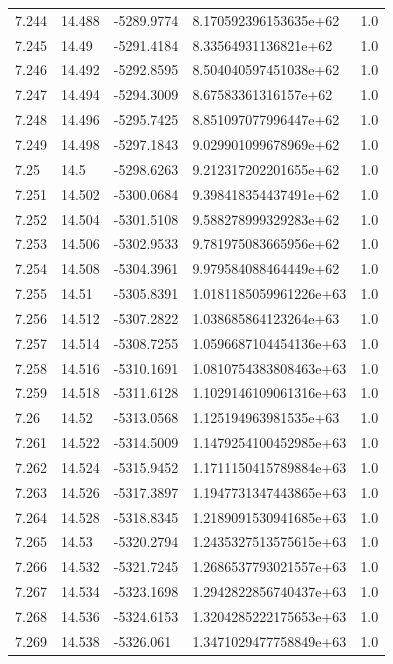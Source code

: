 \begin{tabular}{lllll}
7.244 & 14.488 & -5289.9774 & 8.170592396153635e+62 & 1.0 \\
7.245 & 14.49 & -5291.4184 & 8.33564931136821e+62 & 1.0 \\
7.246 & 14.492 & -5292.8595 & 8.504040597451038e+62 & 1.0 \\
7.247 & 14.494 & -5294.3009 & 8.67583361316157e+62 & 1.0 \\
7.248 & 14.496 & -5295.7425 & 8.851097077996447e+62 & 1.0 \\
7.249 & 14.498 & -5297.1843 & 9.029901099678969e+62 & 1.0 \\
7.25 & 14.5 & -5298.6263 & 9.212317202201655e+62 & 1.0 \\
7.251 & 14.502 & -5300.0684 & 9.398418354437491e+62 & 1.0 \\
7.252 & 14.504 & -5301.5108 & 9.588278999329283e+62 & 1.0 \\
7.253 & 14.506 & -5302.9533 & 9.781975083665956e+62 & 1.0 \\
7.254 & 14.508 & -5304.3961 & 9.979584088464449e+62 & 1.0 \\
7.255 & 14.51 & -5305.8391 & 1.0181185059961226e+63 & 1.0 \\
7.256 & 14.512 & -5307.2822 & 1.038685864123264e+63 & 1.0 \\
7.257 & 14.514 & -5308.7255 & 1.0596687104454136e+63 & 1.0 \\
7.258 & 14.516 & -5310.1691 & 1.0810754383808463e+63 & 1.0 \\
7.259 & 14.518 & -5311.6128 & 1.1029146109061316e+63 & 1.0 \\
7.26 & 14.52 & -5313.0568 & 1.125194963981535e+63 & 1.0 \\
7.261 & 14.522 & -5314.5009 & 1.1479254100452985e+63 & 1.0 \\
7.262 & 14.524 & -5315.9452 & 1.1711150415789884e+63 & 1.0 \\
7.263 & 14.526 & -5317.3897 & 1.1947731347443865e+63 & 1.0 \\
7.264 & 14.528 & -5318.8345 & 1.2189091530941685e+63 & 1.0 \\
7.265 & 14.53 & -5320.2794 & 1.2435327513575615e+63 & 1.0 \\
7.266 & 14.532 & -5321.7245 & 1.2686537793021557e+63 & 1.0 \\
7.267 & 14.534 & -5323.1698 & 1.2942822856740437e+63 & 1.0 \\
7.268 & 14.536 & -5324.6153 & 1.3204285222175653e+63 & 1.0 \\
7.269 & 14.538 & -5326.061 & 1.3471029477758849e+63 & 1.0 \\

\end{tabular}
